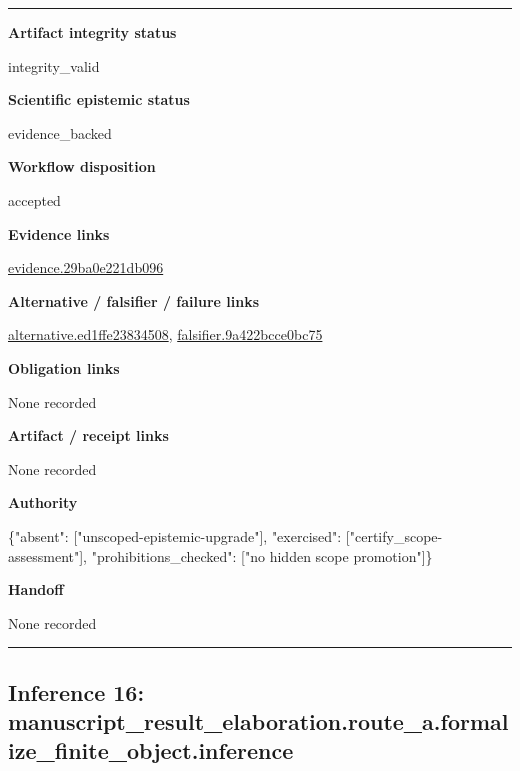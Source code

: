 \documentclass[10pt,a4paper]{article}
\newcommand{\TraceField}[2]{\par\noindent\textbf{#1}\par\noindent #2\par\smallskip}
\newenvironment{TraceDossier}{\par\medskip\noindent\hrule\medskip}{\medskip\hrule\par\medskip}
\begin{document}
\begin{TraceDossier}
\TraceField{Artifact integrity status}{integrity\_\allowbreak{}valid}

\TraceField{Scientific epistemic status}{evidence\_\allowbreak{}backed}

\TraceField{Workflow disposition}{accepted}

\TraceField{Evidence links}{\hyperlink{trace-evidence-87f2a964f2831b9360}{evidence.\allowbreak{}29ba0e221d\allowbreak{}b096}}

\TraceField{Alternative / falsifier / failure links}{\hyperlink{trace-alternative-9dbdb0affacb65add3}{alternativ\allowbreak{}e.\allowbreak{}ed1ffe2383\allowbreak{}4508}, \hyperlink{trace-alternative-4d90300f5864d7a573}{falsifier.\allowbreak{}9a422bcce0\allowbreak{}bc75}}

\TraceField{Obligation links}{None recorded}

\TraceField{Artifact / receipt links}{None recorded}

\TraceField{Authority}{\{"absent":\allowbreak{} ["unscoped\allowbreak{}-\allowbreak{}epistemic-\allowbreak{}upgrade"],\allowbreak{} "exercised\allowbreak{}":\allowbreak{} ["certify\_\allowbreak{}scope-\allowbreak{}assessment\allowbreak{}"], "prohibiti\allowbreak{}ons\_\allowbreak{}checked":\allowbreak{} ["no hidden scope promotion"\allowbreak{}]\}}

\TraceField{Handoff}{None recorded}

\end{TraceDossier}
\pagebreak[2]\subsection{Inference 16: manuscript\allowbreak{}\_\allowbreak{}result\_\allowbreak{}elaboratio\allowbreak{}n.\allowbreak{}route\_\allowbreak{}a.\allowbreak{}formalize\_\allowbreak{}finite\_\allowbreak{}object.\allowbreak{}inference}\label{trace-inference-db33b0608612288575}
\end{document}
